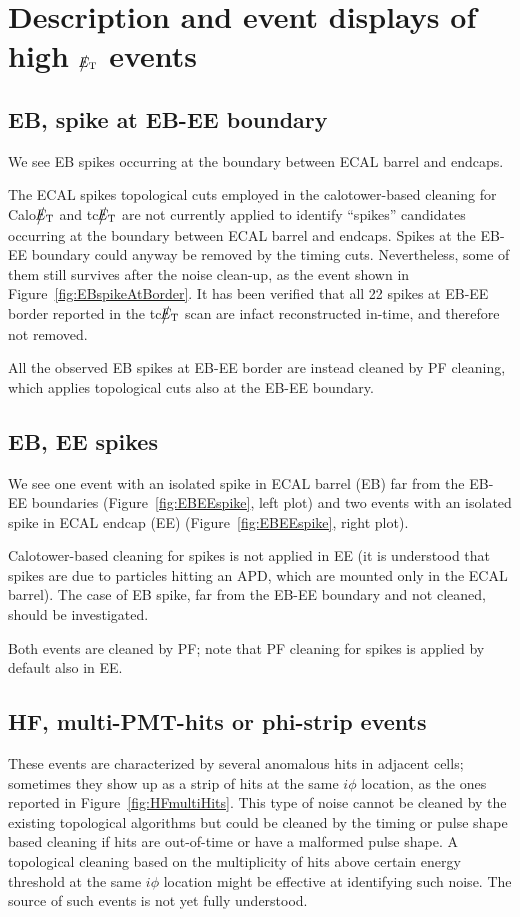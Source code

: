 \section{Description and event displays of high $\big\slash\hspace{-1.6ex}{E_\text{T}}$ events}

\subsection{EB, spike at EB-EE boundary}
We see EB spikes occurring at the boundary between ECAL barrel and endcaps.

The ECAL spikes topological cuts employed in the calotower-based cleaning for Calo$\big\slash\hspace{-1.6ex}{E_\text{T}}$ and tc$\big\slash\hspace{-1.6ex}{E_\text{T}}$ 
are not currently applied to identify ``spikes'' candidates occurring at the boundary between ECAL barrel and endcaps. 
Spikes at the EB-EE boundary could anyway be removed by the timing cuts. Nevertheless, some of them still survives 
after the noise clean-up, as the event shown in Figure~\ref{fig:EBspikeAtBorder}.
It has been verified that all 22 spikes at EB-EE border reported in the tc$\big\slash\hspace{-1.6ex}{E_\text{T}}$ scan are 
infact reconstructed in-time, and therefore not removed.

All the observed EB spikes at EB-EE border are instead cleaned by PF cleaning, which applies topological cuts 
also at the EB-EE boundary.

\subsection{EB, EE spikes}
We see one event with an isolated spike in ECAL barrel (EB) far from the EB-EE boundaries 
(Figure~\ref{fig:EBEEspike}, left plot) and two events with an isolated spike in ECAL 
endcap (EE) (Figure~\ref{fig:EBEEspike}, right plot).

Calotower-based cleaning for spikes is not applied in EE (it is understood that 
spikes are due to particles hitting an APD, which are mounted only in the ECAL barrel). 
The case of EB spike, far from the EB-EE boundary and not cleaned, should be investigated.

Both events are cleaned by PF; note that PF cleaning for spikes is applied by default also in EE.

\subsection{HF, multi-PMT-hits or phi-strip events}
These events are characterized by several anomalous hits in adjacent cells; sometimes they show up as
a strip of hits at the same $i\phi$ location, as the ones reported in Figure~\ref{fig:HFmultiHits}. 
This type of noise cannot be cleaned by the existing topological algorithms but could 
be cleaned by the timing or pulse shape based 
cleaning if hits are out-of-time or have a malformed pulse shape. 
A topological cleaning based on the multiplicity of hits above certain energy threshold 
at the same $i\phi$ location might be effective at identifying such noise.
The source of such events is not yet fully understood.

